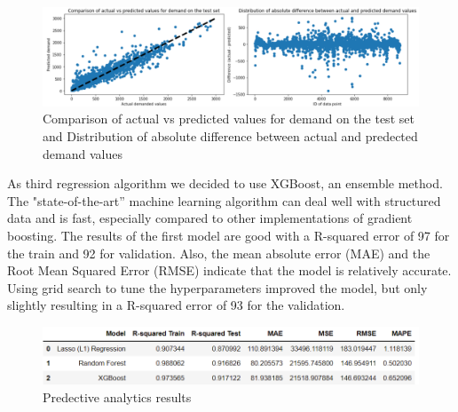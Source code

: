 \begin{figure}[H]
   \centering
    \includegraphics[width=1\linewidth]{./Figures/RF_Fig_3.png}
    \caption{Comparison of actual vs predicted values for demand on the test set and Distribution of absolute difference between actual and predected demand values}
    \label{RF_Fig_3}
\end{figure}
As third regression algorithm we decided to use XGBoost, an ensemble method. The "state-of-the-art” machine learning algorithm can deal well with structured data and is fast, especially compared to other implementations of gradient boosting. The results of the first model are good with a R-squared error of 97 for the train and 92 for validation. Also, the mean absolute error (MAE) and the Root Mean Squared Error (RMSE) indicate that the model is relatively accurate. Using grid search to tune the hyperparameters improved the model, but only slightly resulting in a R-squared error of 93 for the validation.
\begin{figure}[H]
   \centering
    \includegraphics[width=1\linewidth]{./Figures/Predictive_Table_Result.png}
    \caption{Predective analytics results}
    \label{RF_Fig_4}
\end{figure}